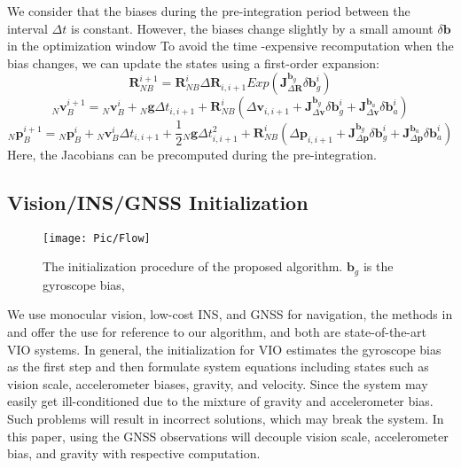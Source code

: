 \documentclass[journal,article,submit,moreauthors,pdftex]{Definitions/mdpi}
\begin{document}
We consider that the biases during the pre-integration period between 
the interval $\Delta{t}$ is constant. 
However, the biases change slightly  by a small amount $\delta\boldsymbol{b}$ in the optimization window
To avoid the time -expensive recomputation when the bias changes, we 
can update the states using a first-order expansion: 
\begin{equation}
	\boldsymbol{R}_{NB}^{i+1} = \boldsymbol{R}_{NB}^{i} \Delta{\boldsymbol{R}_{i,i+1}} Exp \left(\boldsymbol{J}_{\Delta\boldsymbol{R}}^{\boldsymbol{b}_g}\delta\boldsymbol{b}_g^i \right)
\end{equation}
\begin{equation}
	{_N}\boldsymbol{v}_{B}^{i+1} = {_N}\boldsymbol{v}_{B}^{i} + {_N}\boldsymbol{g}\Delta{t}_{i,i+1} + \boldsymbol{R}_{NB}^i(\Delta\boldsymbol{v}_{i,i+1}+\boldsymbol{J}_{\Delta\boldsymbol{v}}^{\boldsymbol{b}_g}\delta\boldsymbol{b}_g^i+\boldsymbol{J}_{\Delta\boldsymbol{v}}^{\boldsymbol{b}_a}\delta\boldsymbol{b}_a^i)
	\label{prein-vel}
\end{equation}
\begin{equation}
	{_N}\boldsymbol{p}_{B}^{i+1} = {_N}\boldsymbol{p}_{B}^{i} + {_N}\boldsymbol{v}_{B}^{i}\Delta{t}_{i,i+1} + \frac{1}{2}{_N}\boldsymbol{g}\Delta{t}_{i,i+1}^2 + \boldsymbol{R}_{NB}^i(\Delta\boldsymbol{p}_{i,i+1}+\boldsymbol{J}_{\Delta\boldsymbol{p}}^{\boldsymbol{b}_g}\delta\boldsymbol{b}_g^i+\boldsymbol{J}_{\Delta\boldsymbol{p}}^{\boldsymbol{b}_a}\delta\boldsymbol{b}_a^i)
	\label{prein-pos}
\end{equation}
Here, the Jacobians can be precomputed during the pre-integration.

\subsection{Vision/INS/GNSS Initialization}
\label{Methods}
\begin{figure}[H]
	\centering
	\texttt{[image: Pic/Flow]}
	\caption{The initialization procedure of the proposed algorithm.
	$ \boldsymbol{b}_g $ is the gyroscope bias, }
\end{figure} 
We use monocular vision, low-cost INS, and GNSS for navigation, the 
methods in \cite{qinRobustInitializationMonocular2017} and \cite{mur-artalVisualInertialMonocularSLAM2017a} offer the use for reference to our algorithm, and both are state-of-the-art VIO systems. 
In general, the initialization for VIO estimates the gyroscope bias as 
the first step and then formulate system equations including states 
such as vision scale, accelerometer biases, gravity, and velocity. 
Since the system may easily get ill-conditioned due to the mixture of 
gravity and accelerometer bias. 
Such problems will result in incorrect solutions, which may break 
the system. 
In this paper, using the GNSS observations will decouple vision scale, 
accelerometer bias, and gravity with respective computation. 
\end{document}

